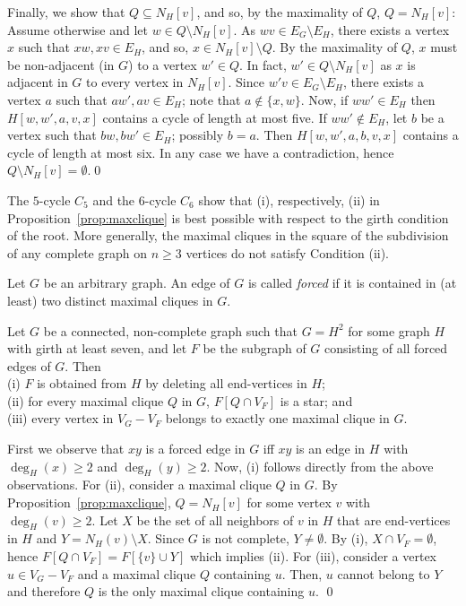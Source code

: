 \documentclass[proceedings]{stacs}
\newlength{\ai}
\begin{document}
Finally, we show that $Q\subseteq N_H[v]$, and so, by the maximality of $Q$, $Q=N_H[v]$:
Assume otherwise and let $w\in Q\setminus N_H[v]$.
As $wv\in E_G\setminus E_H$, there exists a vertex $x$ such that $xw, xv\in E_H$, and so,
$x\in N_H[v]\setminus Q$. By the maximality of $Q$, $x$ must be non-adjacent (in $G$) to a vertex
$w'\in Q$. In fact, $w'\in Q\setminus N_H[v]$ as $x$ is adjacent in $G$ to every vertex in $N_H[v]$.
Since $w'v\in E_G\setminus E_H$, there exists a vertex $a$ such that
$aw', av\in E_H$; note that $a\not\in\{x,w\}$. Now, if $ww'\in E_H$ then $H[w, w', a, v, x]$
contains a cycle of length at most five. If $ww'\not\in E_H$, let $b$ be a vertex such that
$bw, bw'\in E_H$; possibly $b=a$. Then $H[w, w', a, b, v, x]$ contains a cycle of length at most
six. In any case we have a contradiction, hence $Q\setminus N_H[v]=\emptyset$.\qed

The $5$-cycle $C_5$ and the $6$-cycle $C_6$ show that (i), respectively, (ii) in
Proposition~\ref{prop:maxclique} is best possible with respect to the girth condition of
the root. More generally, the maximal cliques in the square of the subdivision of any complete graph
on $n\ge 3$ vertices do not satisfy Condition (ii).


\begin{definition}\label{defi:forced}
Let $G$ be an arbitrary graph. An edge of $G$ is called \emph{forced} if it is contained in (at least)
two distinct maximal cliques in $G$.
\end{definition}
\begin{proposition}\label{prop:forced}
Let $G$ be a connected, non-complete graph such that $G=H^2$ for some graph $H$ with girth at least
seven, and let $F$ be the subgraph of $G$ consisting of all forced edges of $G$. Then\\
(i) $F$ is obtained from $H$ by deleting all end-vertices in $H$;\\
(ii) for every maximal clique $Q$ in $G$, $F[Q\cap V_F]$ is a star; and\\
(iii) every vertex in $V_G-V_F$ belongs to exactly one maximal clique in $G$.
\end{proposition}
\proof First we observe that $xy$ is a forced edge in $G$ iff $xy$ is an edge in $H$
  with $\deg_H(x)\ge 2$ and $\deg_H(y)\ge 2$.
Now, (i) follows directly from the above observations. For (ii),
consider a maximal clique $Q$ in $G$. By Proposition~\ref{prop:maxclique}, $Q=N_H[v]$ for
some vertex $v$ with $\deg_H(v)\ge 2$. Let $X$ be the set of all neighbors of $v$ in $H$ that are
end-vertices in $H$ and $Y=N_H(v)\setminus X$. Since $G$ is not complete, $Y\not=\emptyset$. By (i),
$X\cap V_F=\emptyset$, hence $F[Q\cap V_F]=F[\{v\}\cup Y]$ which implies (ii).
For (iii), consider a vertex $u\in V_G-V_F$ and a maximal clique $Q$ containing $u$.
Then, $u$ cannot belong to $Y$ and therefore $Q$ is the only maximal clique containing $u$. \qed
\end{document}
